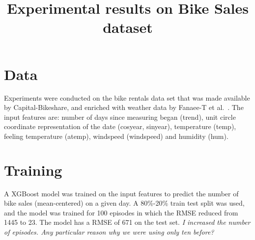 \documentclass{article}
\title{Experimental results on Bike Sales dataset}
\author{}
\date{}
\begin{document}
\maketitle

\section{Data}
Experiments were conducted on the bike rentals data set that was made available by Capital-Bikeshare, and enriched with weather data by Fanaee-T et al.\ \cite{bike}.
The input features are: number of days since measuring began (trend), unit circle coordinate representation of the date (cosyear, sinyear), temperature (temp), feeling temperature (atemp), windspeed (windspeed) and humidity (hum).

\section{Training}
A XGBoost model was trained on the input features to predict the number of bike sales (mean-centered) on a given day.
A 80\%-20\% train test split was used, and the model was trained for 100 episodes in which the RMSE reduced from 1445 to 23.
The model has a RMSE of 671 on the test set. \emph{I increased the number of episodes. Any particular reason why we were using only ten before?}

%
\end{document}
